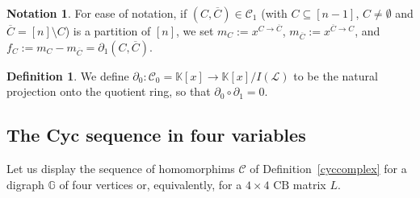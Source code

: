 \documentclass[10pt]{amsart}
\newcommand{\mbk}{\mbox{$\mathbb{K}$}}
\newcommand{\mbg}{\mbox{$\mathbb{G}$}}
\newcommand{\mcc}{\mbox{$\mathcal{C}$}}
\newcommand{\mcl}{\mbox{$\mathcal{L}$}}
\newcommand{\cb}{\mbox{$\mathrm{CB}$}}
\newcommand{\dif}{\mbox{$\partial$}}
\theoremstyle{definition}
\newtheorem{definition}[cdrthm]{Definition}
\newtheorem{notation}[cdrthm]{Notation}
\theoremstyle{remark}
\begin{document}
\begin{notation}\label{fC}
For ease of notation, if $(C,\overline{C})\in \mcc_1$ (with
$C\subseteq [n-1]$, $C\neq\emptyset$ and $\overline{C}=[n]\setminus
C$) is a partition of $[n]$, we set $m_C:=x^{C\to\overline{C}}$,
$m_{\overline C}:=x^{\overline{C}\to C}$, and
$f_C:=m_C-m_{\overline{C}}=\dif_1(C,\overline{C})$.
\end{notation}

\begin{definition}\label{dif0}
 We define $\dif_0:\mcc_0=\mbk[x]\to \mbk[x]/I(\mcl)$ to be the
 natural projection onto the quotient ring, so that $\dif_0\circ
 \dif_1=0$.
\end{definition}

\subsection{The Cyc sequence in four variables}

 Let us display the sequence of homomorphims $\mcc$ of
Definition~\ref{cyccomplex} for a digraph $\mbg$ of four vertices or,
equivalently, for a $4\times 4$ $\cb$ matrix $L$.
\end{document}
